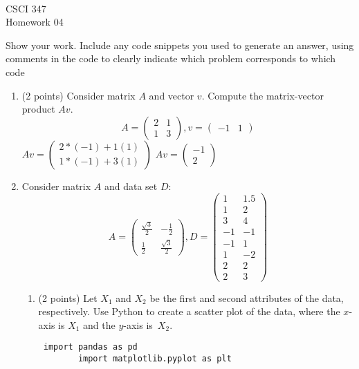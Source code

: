 \documentclass[11pt]{article}
\newcommand{\course}{CSCI 347}
\newcommand{\proj}{Homework 04}
\begin{document}
{ ~\\
    \course \\ 
    \proj \\ 
}

Show your work. Include any code snippets you used to generate an answer, using
comments in the code to clearly indicate which problem corresponds to which code

\begin{enumerate}

    \item (2 points) Consider matrix $A$ and vector $v$.
    Compute the matrix-vector product $Av$.
    $$
        A = \begin{pmatrix} 2 & 1 \\ 1 & 3 \end{pmatrix},
        v = \begin{pmatrix}-1 & 1\end{pmatrix}
    $$
    \newline
    \newline $ Av = \begin{pmatrix} 2*(-1)+1(1) \\ 1*(-1) + 3(1) \end{pmatrix}$ $ Av = \begin{pmatrix} -1 \\ 2 \end{pmatrix}$


    \item Consider matrix $A$ and data set $D$:
    $$
        A = \begin{pmatrix}
            \frac{\sqrt{3}}{2} & -\frac{1}{2} \\ 
            \frac{1}{2} & \frac{\sqrt{3}}{2}
        \end{pmatrix},
        D = \begin{pmatrix}
            1  &  1.5 \\
            1  &  2 \\
            3  &  4 \\
            -1 &  -1 \\
            -1 &  1 \\
            1  & -2 \\
            2  &  2 \\
            2  & 3
        \end{pmatrix}
    $$

    \begin{enumerate}

        \item (2 points) Let $X_1$ and $X_2$ be the first and second attributes
        of the data, respectively.  Use Python to create a scatter plot of the
        data, where the $x$-axis is $X_1$ and the $y$-axis is~$X_2$.
        \newline\begin{lstlisting} import pandas as pd
        import matplotlib.pyplot as plt
        

\end{lstlisting}
\end{enumerate}
\end{enumerate}
\end{document}
